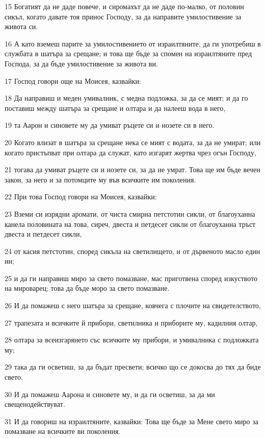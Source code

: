 \par 15 Богатият да не даде повече, и сиромахът да не даде по-малко, от половин сикъл, когато давате тоя принос Господу, за да направите умилостивение за живота си.
\par 16 А като вземеш парите за умилостивението от израилтяните, да ги употребиш в службата в шатъра за срещане; и това ще бъде за спомен на израилтяните пред Господа, за да бъде умилостивение за живота ви.
\par 17 Господ говори още на Моисея, казвайки:
\par 18 Да направиш и меден умивалник, с медна подложка, за да се мият; и да го поставиш между шатъра за срещане и олтара и да налееш вода в него,
\par 19 та Аарон и синовете му да умиват ръцете си и нозете си в него.
\par 20 Когато влизат в шатъра за срещане нека се мият с водата, за да не умират; или когато пристъпват при олтара да служат, като изгарят жертва чрез огън Господу,
\par 21 тогава да умиват ръцете си и нозете си, за да не умрат. Това ще им бъде вечен закон, за него и за потомците му във всичките им поколения.
\par 22 При това Господ говори на Моисея, казвайки:
\par 23 Вземи си изрядни аромати, от чиста смирна петстотин сикли, от благоуханна канела половината на това, сиреч, двеста и петдесет сикли от благоуханна тръст двеста и петдесет сикли,
\par 24 от касия петстотин, според сикъла на светилището, и от дървеното масло един ин;
\par 25 и да ги направиш миро за свето помазване, мас приготвена според изкуството на мироварец; това да бъде моро за свето помазване.
\par 26 И да помажеш с него шатъра за срещане, ковчега с плочите на свидетелството,
\par 27 трапезата и всичките й прибори, светилника и приборите му, кадилния олтар,
\par 28 олтара за всеизгарянето със всичките му прибори, и умивалника с подложката му;
\par 29 така да ги осветиш, за да бъдат пресвети; всичко що се докосва до тях да биде свето.
\par 30 И да помажеш Аарона и синовете му, и да ги осветиш, за да ми свещенодействуват.
\par 31 И да говориш на израилтяните, казвайки: Това ще бъде за Мене свето миро за помазване на всичките ви поколения.
